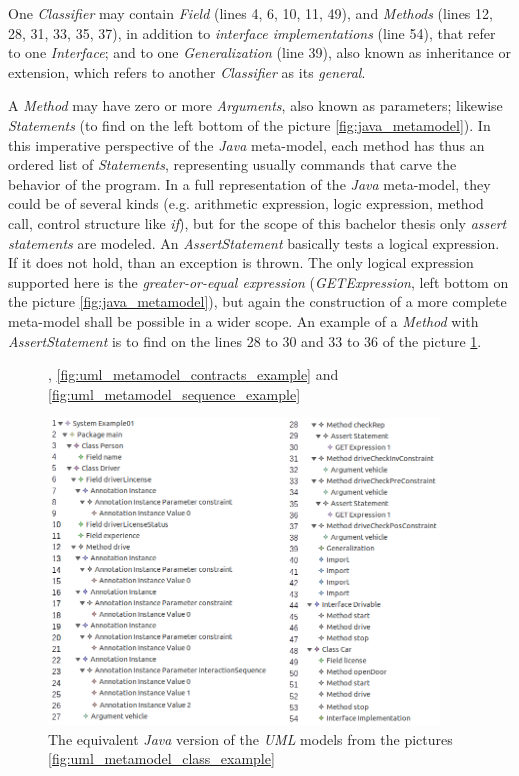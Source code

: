 \documentclass[tuberlin,cic,tc,english,noabntcite]{iiufrgs}
\begin{document}
One \emph{Classifier} may contain \emph{Field} (lines 4, 6, 10, 11, 49), and \emph{Methods} (lines 12, 28, 31, 33, 35, 37), in addition to \emph{interface implementations} (line 54), that refer to one \emph{Interface}; and to one \emph{Generalization} (line 39), also known as inheritance or extension, which refers to another \emph{Classifier} as its \emph{general}.

A \emph{Method} may have zero or more \emph{Arguments}, also known as parameters; likewise \emph{Statements} (to find on the left bottom of the picture \ref{fig:java_metamodel}). In this imperative perspective of the \emph{Java} meta-model, each method has thus an ordered list of \emph{Statements}, representing usually commands that carve the behavior of the program. In a full representation of the \emph{Java} meta-model, they could be of several kinds (e.g. arithmetic expression, logic expression, method call, control structure like \emph{if}), but for the scope of this bachelor thesis only \emph{assert statements} are modeled. An \emph{AssertStatement} basically tests a logical expression. If it does not hold, than an exception is thrown. The only logical expression supported here is the \emph{greater-or-equal expression} (\emph{GETExpression}, left bottom on the picture \ref{fig:java_metamodel}), but again the construction of a more complete meta-model shall be possible in a wider scope. An example of a \emph{Method} with \emph{AssertStatement} is to find on the lines 28 to 30 and 33 to 36 of the picture \ref{fig:java_metamodel_example}.

\begin{figure}[h]
    \caption{The equivalent \emph{Java} version of the \emph{UML} models from the pictures \ref{fig:uml_metamodel_class_example}},  \ref{fig:uml_metamodel_contracts_example} and  \ref{fig:uml_metamodel_sequence_example}
    \begin{center}
        \includegraphics[width=28em]{javaMetamodelExample01}
    \end{center}
    \label{fig:java_metamodel_example}
\end{figure}
\end{document}
